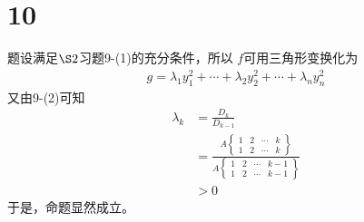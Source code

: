 \documentclass{article}
\begin{document}
\section*{10}

题设满足$\S2 $习题9-(1)的充分条件，所以
$f$可用三角形变换化为
\begin{align*}
  g = \lambda_1 y_1^2 + \cdots + \lambda_2 y_2^2 + \cdots + \lambda_n y_n^2
\end{align*}
又由9-(2)可知
\begin{align*}
  \lambda_k & = \frac{D_k}{D_{k - 1}}                         \\
            & = \frac{A \begin{Bmatrix}
                            1 & 2 & \cdots & k \\
                            1 & 2 & \cdots & k
                          \end{Bmatrix}}{A \begin{Bmatrix}
                                             1 & 2 & \cdots & k-1 \\
                                             1 & 2 & \cdots & k-1
                                           \end{Bmatrix}} \\
            & > 0
\end{align*}
于是，命题显然成立。
\end{document}
